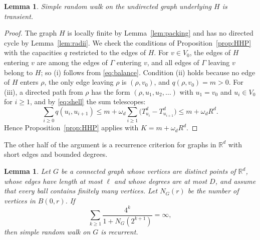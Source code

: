 \documentclass[11pt]{amsart}
\newtheorem{lemma}[theorem]{Lemma}
\theoremstyle{remark}
\numberwithin{equation}{section}
\newcommand{\R}{\mathbb{R}}
\begin{document}
\begin{lemma}\label{lem:transient}
Simple random walk on the undirected graph underlying $H$ is transient.
\end{lemma}

\begin{proof}
The graph $H$ is locally finite by Lemma~\ref{lem:packing} and has no directed cycle by Lemma~\ref{lem:radii}. We check the conditions of Proposition~\ref{prop:HHP} with the capacities $q$ restricted to the edges of $H$. For $v\in V_0$, the edges of $H$ entering $v$ are among the edges of $\Gamma$ entering $v$, and all edges of $\Gamma$ leaving $v$ belong to $H$; so (i) follows from \eqref{eq:balance}. Condition (ii) holds because no edge of $H$ enters $\rho$, the only edge leaving $\rho$ is $(\rho,v_0)$, and $q(\rho,v_0)=m>0$. For (iii), a directed path from $\rho$ has the form $(\rho,u_1,u_2,\dots)$ with $u_1=v_0$ and $u_i\in V_0$ for $i\ge1$, and by \eqref{eq:shell} the sum telescopes:
\[
\sum_{i\ge0}q(u_i,u_{i+1})\le m+\omega_d\sum_{i\ge1}\bigl(T_{u_i}^d-T_{u_{i+1}}^d\bigr)\le m+\omega_dR^d .
\]
Hence Proposition~\ref{prop:HHP} applies with $K=m+\omega_dR^d$.
\end{proof}

The other half of the argument is a recurrence criterion for graphs in $\R^d$ with short edges and bounded degrees.

\begin{lemma}\label{lem:recurrent}
Let $G$ be a connected graph whose vertices are distinct points of $\R^d$, whose edges have length at most $\ell$ and whose degrees are at most $D$, and assume that every ball contains finitely many vertices. Let $N_G(r)$ be the number of vertices in $B(0,r)$. If
\begin{equation}\label{eq:NW}
\sum_{k\ge1}\frac{4^k}{1+N_G(2^{k+1})}=\infty,
\end{equation}
then simple random walk on $G$ is recurrent.
\end{lemma}
\end{document}
